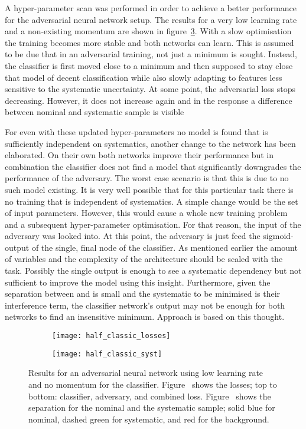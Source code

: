 A hyper-parameter scan was performed in order to achieve a better performance for the adversarial neural network setup. The results for a very low learning rate and a non-existing momentum are shown in figure~\ref{fig:app1:half}.
With a slow optimisation the training becomes more stable and both networks can learn. This is assumed to be due that in an adversarial training, not just a minimum is sought. Instead, the classifier is first moved close to a minimum and then supposed to stay close that model of decent classification while also slowly adapting to features less sensitive to the systematic uncertainty. At some point, the adversarial loss stops decreasing. However, it does not increase again and in the response a difference between nominal and systematic sample is visible

For even with these updated hyper-parameters no model is found that is sufficiently independent on systematics, another change to the network has been elaborated.
On their own both networks improve their performance but in combination the classifier does not find a model that significantly downgrades the performance of the adversary.
The worst case scenario is that this is due to no such model existing. It is very well possible that for this particular task there is no training that is independent of systematics.
A simple change would be the set of input parameters. However, this would cause a whole new training problem and a subsequent hyper-parameter optimisation. For that reason, the input of the adversary was looked into. At this point, the adversary is just feed the sigmoid-output of the single, final node of the classifier. As mentioned earlier the amount of variables and the complexity of the architecture should be scaled with the task. Possibly the single output is enough to see a systematic dependency but not sufficient to improve the model using this insight. Furthermore, given the separation between \tW and \ttbar is small and the systematic to be minimised is their interference term, the classifier network's output may not be enough for both networks to find an insensitive minimum. Approach  is based on this thought.

\begin{figure}[htbp]
    \centering
    \begin{subfigure}[b]{0.45\textwidth}
        \texttt{[image: half\_classic\_losses]}
        \caption{}
        \label{fig:app1:half:losses}
    \end{subfigure}
\quad
    \begin{subfigure}[b]{0.45\textwidth}
        \texttt{[image: half\_classic\_syst]}
        \caption{}
        \label{fig:app1:half:syst}
    \end{subfigure}
    \caption{Results for an adversarial neural network using low learning rate and no momentum for the classifier. Figure~ shows the losses; top to bottom: classifier, adversary, and combined loss. Figure~ shows the separation for the nominal and the systematic sample; solid blue for nominal, dashed green for systematic, and red for the background.}
	\label{fig:app1:half}
\end{figure}



